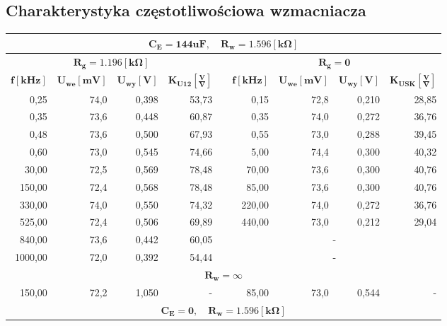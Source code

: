 \documentclass[a4paper,12pt]{article}
\begin{document}
\subsection{Charakterystyka częstotliwościowa wzmacniacza}
\begin{table}[ht]
  \begin{center}
  \begin{tabular}{|r|r|r|r|r|r|r|r|r|}
    \hline
    \multicolumn{9}{|c|}{\textbf{$\mathbf{C_E = 144uF}, \quad \mathbf{R_w=1.596[k\Omega]}$}} \\ \hline
    \multicolumn{4}{|c|}{$\mathbf{R_g = 1.196[k\Omega]}$} & & \multicolumn{4}{c|}{$\mathbf{R_g = 0}$} \\ \cline{1-4} \cline{6-9}
    $\mathbf{f[kHz]}$ & $\mathbf{U_{we}[mV]}$ & $\mathbf{U_{wy}[V]}$ & $\mathbf{K_{U12}[\frac{V}{V}]}$ & & $\mathbf{f[kHz]}$ & $\mathbf{U_{we}[mV]}$ & $\mathbf{U_{wy}[V]}$ & $\mathbf{K_{USK}[\frac{V}{V}]}$ \\ \cline{1-4} \cline{6-9}
    0,25 & 74,0 & 0,398 & 53,73 & & 0,15 & 72,8 & 0,210 & 28,85 \\ \cline{1-4} \cline{6-9}
    0,35 & 73,6 & 0,448 & 60,87 & & 0,35 & 74,0 & 0,272 & 36,76 \\ \cline{1-4} \cline{6-9}
    0,48 & 73,6 & 0,500 & 67,93 & & 0,55 & 73,0 & 0,288 & 39,45 \\ \cline{1-4} \cline{6-9}
    0,60 & 73,0 & 0,545 & 74,66 & & 5,00 & 74,4 & 0,300 & 40,32 \\ \cline{1-4} \cline{6-9}
    30,00 & 72,5 & 0,569 & 78,48 & & 70,00 & 73,6 & 0,300 & 40,76 \\ \cline{1-4} \cline{6-9}
    150,00 & 72,4 & 0,568 & 78,48 & & 85,00 & 73,6 & 0,300 & 40,76 \\ \cline{1-4} \cline{6-9}
    330,00 & 74,0 & 0,550 & 74,32 & & 220,00 & 74,0 & 0,272 & 36,76 \\ \cline{1-4} \cline{6-9}
    525,00 & 72,4 & 0,506 & 69,89 & & 440,00 & 73,0 & 0,212 & 29,04 \\ \cline{1-4} \cline{6-9}
    840,00 & 73,6 & 0,442 & 60,05 & & \multicolumn{4}{c|}{-} \\ \cline{1-4} \cline{6-9}
    1000,00 & 72,0 & 0,392 & 54,44 & & \multicolumn{4}{c|}{-} \\ \hline
    \multicolumn{9}{|c|}{$\mathbf{R_w = \infty}$} \\ \hline
    150,00 & 72,2 & 1,050 & - & & 85,00 & 73,0 & 0,544 & - \\ \hline
    \multicolumn{9}{|c|}{\textbf{$\mathbf{C_E = 0}, \quad \mathbf{R_w=1.596[k\Omega]}$}} \\ \hline

\end{tabular}
\end{center}
\end{table}
\end{document}

